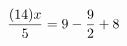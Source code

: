 \documentclass[preview]{standalone}
\begin{document}
\begin{align*}
\special{dvisvgm:raw <g id='unique000'>}\frac{(14) x}{5} = 9 - \frac{9}{2} + 8\special{dvisvgm:raw </g>}
\end{align*}
\end{document}
